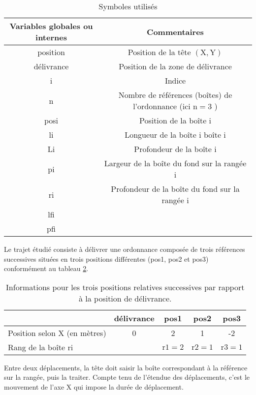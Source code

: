 \begin{table}
\centering
\begin{tabular}{|c|c|}
\hline
Variables globales ou internes & Commentaires \\
\hline
position & Position de la tête $(\mathrm{X}, \mathrm{Y})$ \\
\hline
délivrance & Position de la zone de délivrance \\
\hline
i & Indice \\
\hline
n & Nombre de références (boîtes) de l'ordonnance (ici $\mathrm{n}=3$ ) \\
\hline
posi & Position de la boîte i \\
\hline
li & Longueur de la boîte i boîte i \\
\hline
Li & Profondeur de la boîte i \\
\hline
pi & Largeur de la boîte du fond sur la rangée i \\
\hline
ri & Profondeur de la boîte du fond sur la rangée i \\
\hline
lfi &  \\
\hline
pfi &  \\
\hline
\end{tabular}

\caption{\label{tab:CCS_TSI_2021_tab_04} Symboles utilisés}
\end{table}

Le trajet étudié consiste à délivrer une ordonnance composée de trois références successives situées en trois positions différentes (pos1, pos2 et pos3) conformément au tableau \ref{tab:CCS_TSI_2021_tab_05}.

\begin{table}
\centering
\begin{tabular}{|l|c|c|c|c|}
\hline
 & délivrance & pos1 & pos2 & pos3 \\
\hline
Position selon X (en mètres) & 0 & 2 & 1 & -2 \\
\hline
Rang de la boîte ri &  & $\mathrm{r} 1=2$ & $\mathrm{r} 2=1$ & $\mathrm{r} 3=1$ \\
\hline
\end{tabular}

\caption{\label{tab:CCS_TSI_2021_tab_05}Informations pour les trois positions relatives successives par rapport à la position de délivrance.}
\end{table}

Entre deux déplacements, la tête doit saisir la boîte correspondant à la référence sur la rangée, puis la traiter. Compte tenu de l'étendue des déplacements, c'est le mouvement de l'axe X qui impose la durée de déplacement.

